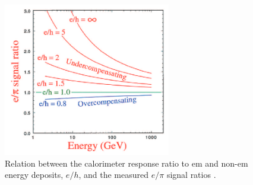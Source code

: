  \begin{figure}
	\centering
	\includegraphics[width=0.65\textwidth]{IMG/Cap2/compensation.png}
	\caption{Relation between the calorimeter response ratio to em and non-em energy deposits, $e/h$, and the measured $e/\pi$ signal ratios \cite{Wigmans_art_of_cal}.}
	\label{fig:compensation}
\end{figure}

